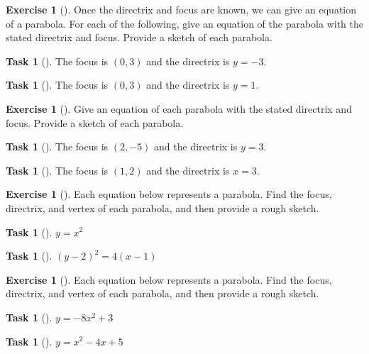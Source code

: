 \documentclass[10pt,]{book}
\theoremstyle{plain}
\theoremstyle{definition}
\theoremstyle{definition}
\theoremstyle{definition}
\theoremstyle{definition}
\newtheorem{exploration}[project]{Exercise}
\newtheorem{task}[project]{Task}
\theoremstyle{definition}
\numberwithin{equation}{section}
\begin{document}
\begin{exploration}[]\label{exploration-57}
Once the directrix and focus are known, we can give an equation of a parabola. For each of the following, give an equation of the parabola with the stated directrix and focus. Provide a sketch of each parabola.%
\begin{task}[]\label{task-93}
The focus is \((0,3)\) and the directrix is \(y=-3\).%
\end{task}
\begin{task}[]\label{task-94}
The focus is \((0,3)\) and the directrix is \(y=1\).%
\end{task}
\end{exploration}
\begin{exploration}[]\label{exploration-58}
Give an equation of each parabola with the stated directrix and focus. Provide a sketch of each parabola.%
\begin{task}[]\label{task-95}
The focus is \((2,-5)\) and the directrix is \(y=3\).%
\end{task}
\begin{task}[]\label{task-96}
The focus is \((1,2)\) and the directrix is \(x=3\).%
\end{task}
\end{exploration}
\begin{exploration}[]\label{exploration-59}
Each equation below represents a parabola. Find the focus, directrix, and vertex of each parabola, and then provide a rough sketch.%
\begin{task}[]\label{task-97}
\(y=x^2\)%
\end{task}
\begin{task}[]\label{task-98}
\((y-2)^2=4(x-1)\)%
\end{task}
\end{exploration}
\begin{exploration}[]\label{exploration-60}
Each equation below represents a parabola. Find the focus, directrix, and vertex of each parabola, and then provide a rough sketch.%
\begin{task}[]\label{task-99}
\(y=-8x^2+3\)%
\end{task}
\begin{task}[]\label{task-100}
\(y=x^2-4x+5\)%
\end{task}
\end{exploration}
\typeout{************************************************}
\typeout{************************************************}
\end{document}
